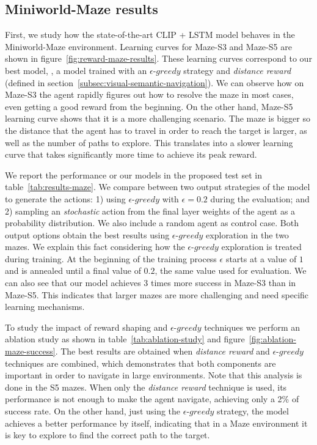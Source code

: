 \subsection{Miniworld-Maze results}\label{subsec:miniworld-maze-results}

First, we study how the state-of-the-art CLIP + LSTM model behaves in the Miniworld-Maze environment.
Learning curves for Maze-S3 and Maze-S5 are shown in figure~\ref{fig:reward-maze-results}.
These learning curves correspond to our best model, \ie, a model trained with an $\epsilon\text{-}greedy$ strategy and \textit{distance reward} (defined in section~\ref{subsec:visual-semantic-navigation}).
We can observe how on Maze-S3 the agent rapidly figures out how to resolve the maze in most cases, even getting a good reward from the beginning.
On the other hand, Maze-S5 learning curve shows that it is a more challenging scenario.
The maze is bigger so the distance that the agent has to travel in order to reach the target is larger, as well as the number of paths to explore.
This translates into a slower learning curve that takes significantly more time to achieve its peak reward.


We report the performance or our models in the proposed test set in table~\ref{tab:results-maze}.
We compare between two output strategies of the model to generate the actions:
1) using $\epsilon\text{-}greedy$ with $\epsilon=0.2$ during the evaluation;
and 2) sampling an \textit{stochastic} action from the final layer weights of the agent as a probability distribution.
We also include a random agent as control case.
Both output options obtain the best results using $\epsilon\text{-}greedy$ exploration in the two mazes.
We explain this fact considering how the $\epsilon\text{-}greedy$ exploration is treated during training.
At the beginning of the training process $\epsilon$ starts at a value of $1$ and is annealed until a final value of $0.2$, the same value used for evaluation.
We can also see that our model achieves 3 times more success in Maze-S3 than in Maze-S5.
This indicates that larger mazes are more challenging and need specific learning mechanisms.

To study the impact of reward shaping and $\epsilon\text{-}greedy$ techniques we perform an ablation study as shown in table~\ref{tab:ablation-study} and figure~\ref{fig:ablation-maze-success}.
The best results are obtained when \textit{distance reward} and $\epsilon\text{-}greedy$ techniques are combined, which demonstrates that both components are important in order to navigate in large environments.
Note that this analysis is done in the S5 mazes.
When only the \textit{distance reward} technique is used, its performance is not enough to make the agent navigate, achieving only a 2\% of success rate.
On the other hand, just using the $\epsilon\text{-}greedy$ strategy, the model achieves a better performance by itself, indicating that in a Maze environment it is key to explore to find the correct path to the target.

